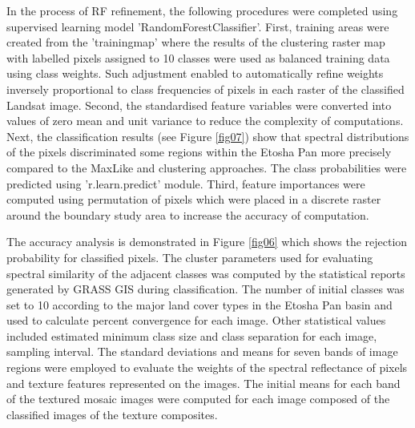 \documentclass[climate,article,submit,pdftex,moreauthors]{Definitions/mdpi}
\begin{document}
In the process of RF refinement, the following procedures were completed using supervised learning model 'RandomForestClassifier'. First, training areas were created from the 'trainingmap' where the results of the clustering raster map with labelled pixels assigned to 10 classes were used as balanced training data using class weights. Such adjustment enabled to automatically refine weights inversely proportional to class frequencies of pixels in each raster of the classified Landsat image. Second, the standardised feature variables were converted into values of zero mean and unit variance to reduce the complexity of computations. Next, the classification results (see Figure \ref{fig07}) show that spectral distributions of the pixels discriminated some regions within the Etosha Pan more precisely compared to the MaxLike and clustering approaches. The class probabilities were predicted using 'r.learn.predict' module. Third, feature importances were computed using permutation of pixels which were placed in a discrete raster around the boundary study area  to increase the accuracy of computation. 

The accuracy analysis is demonstrated in Figure \ref{fig06} which shows the rejection probability for classified pixels. The cluster parameters used for evaluating spectral similarity of the adjacent classes was computed by the statistical reports generated by GRASS GIS during classification. The number of initial classes was set to 10 according to the major land cover types in the Etosha Pan basin and used to calculate percent convergence for each image. Other statistical values included estimated minimum class size and class separation for each image, sampling interval. The standard deviations and means for seven bands of image regions were employed to evaluate the weights of the spectral reflectance of pixels and texture features represented on the images. The initial means for each band of the textured mosaic images were computed for each image composed of the classified images of the texture composites. 
\end{document}
